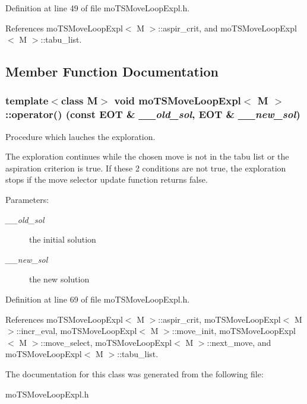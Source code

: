 Definition at line 49 of file mo\-TSMove\-Loop\-Expl.h.

References mo\-TSMove\-Loop\-Expl$<$ M $>$::aspir\_\-crit, and mo\-TSMove\-Loop\-Expl$<$ M $>$::tabu\_\-list.

\subsection{Member Function Documentation}
\subsubsection{\setlength{\rightskip}{0pt plus 5cm}template$<$class M$>$ void {\bf mo\-TSMove\-Loop\-Expl}$<$ M $>$::operator() (const {\bf EOT} \& {\em \_\-\_\-old\_\-sol}, {\bf EOT} \& {\em \_\-\_\-new\_\-sol})\hspace{0.3cm}{\tt  [inline]}}\label{classmo_t_s_move_loop_expl_f601bbd0ccc41d6fbe3df9fcd87ad9e7}


Procedure which lauches the exploration. 

The exploration continues while the chosen move is not in the tabu list or the aspiration criterion is true. If these 2 conditions are not true, the exploration stops if the move selector update function returns false.

\begin{Desc}
\item[Parameters:]
\begin{description}
\item[{\em \_\-\_\-old\_\-sol}]the initial solution \item[{\em \_\-\_\-new\_\-sol}]the new solution \end{description}
\end{Desc}


Definition at line 69 of file mo\-TSMove\-Loop\-Expl.h.

References mo\-TSMove\-Loop\-Expl$<$ M $>$::aspir\_\-crit, mo\-TSMove\-Loop\-Expl$<$ M $>$::incr\_\-eval, mo\-TSMove\-Loop\-Expl$<$ M $>$::move\_\-init, mo\-TSMove\-Loop\-Expl$<$ M $>$::move\_\-select, mo\-TSMove\-Loop\-Expl$<$ M $>$::next\_\-move, and mo\-TSMove\-Loop\-Expl$<$ M $>$::tabu\_\-list.

The documentation for this class was generated from the following file:\begin{CompactItemize}
\item 
mo\-TSMove\-Loop\-Expl.h\end{CompactItemize}
